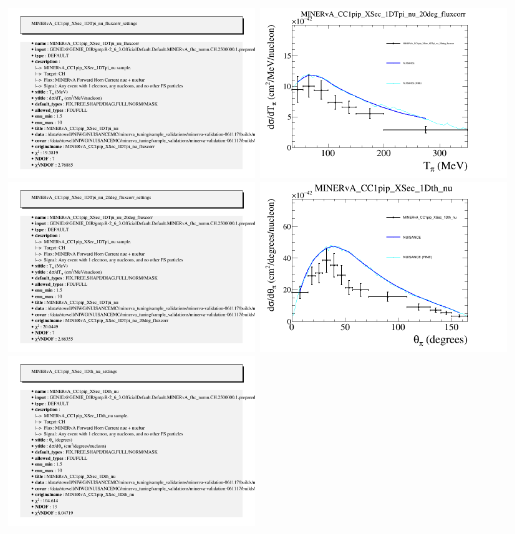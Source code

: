 \documentclass{article}
\begin{document}
\includegraphics[width=0.49\textwidth]{figures/nuisance_MINERvA_CC1pip_XSec_1DTpi_nu_fluxcorr_info.png}
\centering
\includegraphics[width=0.49\textwidth]{figures/nuisance_MINERvA_CC1pip_XSec_1DTpi_nu_20deg_fluxcorr_comp.png}
\includegraphics[width=0.49\textwidth]{figures/nuisance_MINERvA_CC1pip_XSec_1DTpi_nu_20deg_fluxcorr_info.png}
\centering
\includegraphics[width=0.49\textwidth]{figures/nuisance_MINERvA_CC1pip_XSec_1Dth_nu_comp.png}
\includegraphics[width=0.49\textwidth]{figures/nuisance_MINERvA_CC1pip_XSec_1Dth_nu_info.png}
\end{document}
